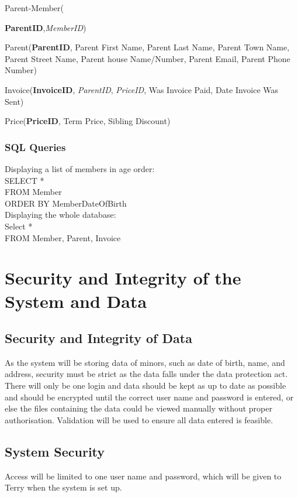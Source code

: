 Parent-Member({\textbf{ParentID},\textit{MemberID})

Parent(\textbf{ParentID}, Parent First Name, Parent Last Name, Parent Town Name, Parent Street Name, Parent house Name/Number,  Parent Email, Parent Phone Number)

Invoice(\textbf{InvoiceID}, \textit{ParentID}, \textit{PriceID}, Was Invoice Paid, Date Invoice Was Sent)

Price(\textbf{PriceID}, Term Price, Sibling Discount)

\subsubsection{SQL Queries}

Displaying a list of members in age order: \\
SELECT *  \\
FROM Member \\
ORDER BY MemberDateOfBirth \\

Displaying the whole database: \\
Select * \\
FROM Member, Parent, Invoice \\

\section{Security and Integrity of the System and Data}

\subsection{Security and Integrity of Data}
As the system will be storing data of minors, such as date of birth, name, and address, security must be strict as the data falls under the data protection act. There will only be one login and data should be kept as up to date as possible and should be encrypted until the correct user name and password is entered, or else the files containing the data could be viewed manually without proper authorisation. Validation will be used to ensure all data entered is feasible.

\subsection{System Security}
Access will be limited to one user name and password, which will be given to Terry when the system is set up.

}
